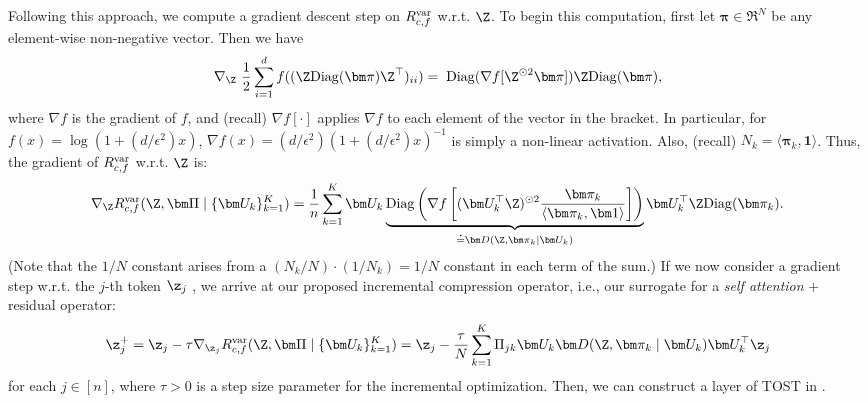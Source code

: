 \documentclass[../../book-main.tex]{subfiles}
\begin{document}
Following this approach, we compute a gradient descent step on $R_{c,f}^{\rm var}$ w.r.t. $\Z$.
To begin this computation, first let $\bm \pi \in \Re^N$ be any element-wise non-negative vector. Then we have
\begin{equation}\label{eq1:grad Rcf}
\nabla_{\Z} \ \frac{1}{2} \sum_{i = 1}^{d} f(  (\Z \mathrm{Diag}(\bm \pi) \Z^{\top} )_{ii}) %
= \; \mathrm{Diag}(\nabla f[ \Z^{\odot 2} \bm \pi] ) \Z \mathrm{Diag}(\bm \pi),
\end{equation}
%
where $\nabla f$ is the gradient of $f$, and (recall) $\nabla f[\cdot]$ applies $\nabla f$ to each element of the vector in the bracket. In particular, for $ f(x) = \log(1 + (d/\epsilon^{2}) x)$,  $\nabla f(x) = (d / \epsilon^{2}) (1+ (d / \epsilon^{2}) x)^{-1}$ is simply a non-linear activation. Also, (recall) $N_{k} = \langle \bm \pi_{k}, \bm 1\rangle$. Thus, the gradient of $R^{\rm var}_{c,f}$ w.r.t. $\Z$ is:
\begin{align}\label{eq2:grad Rcf}
    \nabla_{\Z} R^{\rm var}_{c,f}(\Z,\bm \Pi \mid \{\bm U_{k}\}_{k = 1}^{K}) =  \frac{1}{n} \sum_{k=1}^K \bm U_{k} \underbrace{\mathrm{Diag} \left( \nabla f\left[ (\bm U_{k}^{\top} \Z)^{\odot 2}  \frac{\bm \pi_k}{\langle \bm \pi_{k}, \bm 1\rangle} \right] \right)}_{\doteq \bm D(\Z, \bm \pi_{k} \mid \bm U_{k})} \bm U_{k}^{\top} \Z \mathrm{Diag}(\bm \pi_k).
\end{align}
(Note that the $1/N$ constant arises from a $(N_{k}/N)\cdot (1/N_{k}) = 1/N$ constant in each term of the sum.) If we now consider a gradient step w.r.t. the $j$-th token $\z_j$
, we arrive at our proposed incremental compression operator, i.e., our surrogate for a \textit{self attention} + residual operator:
%
\vspace{-2mm}
\begin{equation}\label{eq:layer-operation-orig}
    \z_j^+ = \z_{j} - \tau \nabla_{\z_{j}}R_{c, f}^{\rm var}(\Z, \bm \Pi \mid \{\bm U_{k}\}_{k = 1}^{K}) = \z_j - \frac{\tau}{N} \sum_{k=1}^K \Pi_{jk} \bm U_{k} \bm D(\Z, \bm \pi_{k} \mid \bm U_{k}) \bm U_{k}^{\top} \z_j
\end{equation}
for each \(j \in [n]\), where $\tau > 0$ is a step size parameter for the incremental optimization. Then, we can construct a layer of TOST in .  
\end{document}
